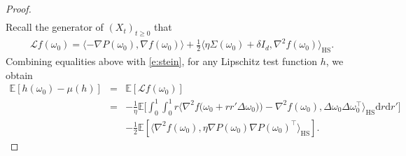 \documentclass[12pt]{amsart}
\theoremstyle{definition}
\theoremstyle{remark}
\numberwithin{equation}{section}
\newcommand{\dif}{\mathrm{d}}
\newcommand{\E}{\mathbb{E}}            %
\newcommand{\Ll}{\langle}
\newcommand{\Rr}{\rangle}
\begin{document}
\begin{proof}
\begin{eqnarray*}
\end{eqnarray*}
Recall the generator of $(X_t)_{t\ge0}$ that 
\begin{eqnarray*}
\mathcal L f(\omega_0)=\Ll -\nabla P(\omega_0), \nabla f(\omega_0) \Rr+\frac1 2\Ll \eta\Sigma(\omega_0)+\delta I_d,\nabla^2f(\omega_0) \Rr_{\text{HS}}.
\end{eqnarray*}
Combining equalities above with \eqref{e:stein}, for any Lipschitz test function $h$, we obtain
\begin{eqnarray}\label{e:lem3.1.2}
\E[h(\omega_0)-\mu(h)]&=&\E[\mathcal L f(\omega_0)]\nonumber\\
&=& -\frac1\eta \E\big[\int_0^1\int_0^1 r\Ll \nabla^2f\big(\omega_0+rr'\Delta\omega_0)\big)-\nabla^2f(\omega_0),\Delta\omega_0\Delta\omega_0^\top     \Rr_{\text {HS}}\dif r\dif r'\big]\\
&&-\frac12\E[\Ll  \nabla^2f(\omega_0),\eta\nabla P(\omega_0)\nabla P(\omega_0)^\top
 \Rr_{\text{HS}}].\nonumber
\end{eqnarray}



\end{proof}
\end{document}
